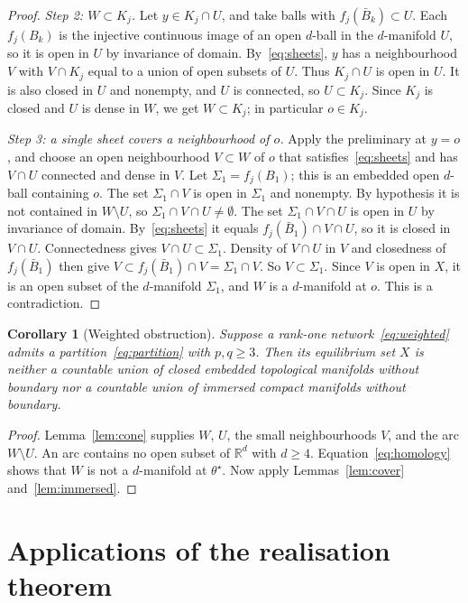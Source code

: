 \documentclass[11pt,a4paper]{article}
\newtheorem{corollary}[theorem]{Corollary}
\theoremstyle{definition}\newtheorem{conjecture}{Conjecture}
\theoremstyle{remark}\newtheorem{remark}[theorem]{Remark}
\newcommand{\R}{\mathbb R}
\begin{document}
\begin{proof}
\emph{Step 2: $W\subset K_j$.} Let $y\in K_j\cap U$, and take balls with $f_j(\bar B_k)\subset U$. Each $f_j(B_k)$ is the injective continuous image of an open $d$-ball in the $d$-manifold $U$, so it is open in $U$ by invariance of domain. By~\eqref{eq:sheets}, $y$ has a neighbourhood $V$ with $V\cap K_j$ equal to a union of open subsets of $U$. Thus $K_j\cap U$ is open in $U$. It is also closed in $U$ and nonempty, and $U$ is connected, so $U\subset K_j$. Since $K_j$ is closed and $U$ is dense in $W$, we get $W\subset K_j$; in particular $o\in K_j$.

\emph{Step 3: a single sheet covers a neighbourhood of $o$.} Apply the preliminary at $y=o$, and choose an open neighbourhood $V\subset W$ of $o$ that satisfies~\eqref{eq:sheets} and has $V\cap U$ connected and dense in $V$. Let $\Sigma_1=f_j(B_1)$; this is an embedded open $d$-ball containing $o$. The set $\Sigma_1\cap V$ is open in $\Sigma_1$ and nonempty. By hypothesis it is not contained in $W\setminus U$, so $\Sigma_1\cap V\cap U\neq\emptyset$. The set $\Sigma_1\cap V\cap U$ is open in $U$ by invariance of domain. By~\eqref{eq:sheets} it equals $f_j(\bar B_1)\cap V\cap U$, so it is closed in $V\cap U$. Connectedness gives $V\cap U\subset\Sigma_1$. Density of $V\cap U$ in $V$ and closedness of $f_j(\bar B_1)$ then give $V\subset f_j(\bar B_1)\cap V=\Sigma_1\cap V$. So $V\subset\Sigma_1$. Since $V$ is open in $X$, it is an open subset of the $d$-manifold $\Sigma_1$, and $W$ is a $d$-manifold at $o$. This is a contradiction.
\end{proof}

\begin{corollary}[Weighted obstruction]\label{cor:weighted}
Suppose a rank-one network~\eqref{eq:weighted} admits a partition~\eqref{eq:partition} with $p,q\ge3$. Then its equilibrium set $X$ is neither a countable union of closed embedded topological manifolds without boundary nor a countable union of immersed compact manifolds without boundary.
\end{corollary}
\begin{proof}
Lemma~\ref{lem:cone} supplies $W$, $U$, the small neighbourhoods $V$, and the arc $W\setminus U$. An arc contains no open subset of $\R^d$ with $d\ge4$. Equation~\eqref{eq:homology} shows that $W$ is not a $d$-manifold at $\theta^\star$. Now apply Lemmas~\ref{lem:cover} and~\ref{lem:immersed}.
\end{proof}

\section{Applications of the realisation theorem}\label{sec:applications}
\end{document}
